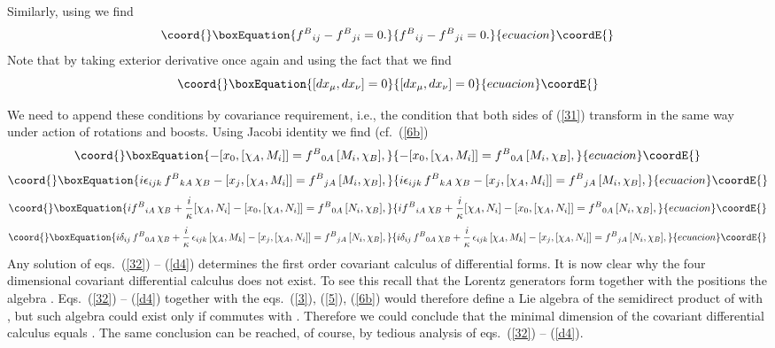 \documentclass  [12pt] {article}
\begin{document}
Similarly, using \coordHE{} we find
\begin{equation}\coord{}\boxEquation{\label{33a}
f^{B}{}_{ij} -f^{B}{}_{ji} =0.
}{f^{B}{}_{ij} -f^{B}{}_{ji} =0.
}{ecuacion}\coordE{}\end{equation}
Note that by taking exterior derivative once again and using the fact that \coordHE{} we find
\begin{equation}\coord{}\boxEquation{\label{33b}
 [dx_\mu, dx_\nu] =0
}{[dx_\mu, dx_\nu] =0
}{ecuacion}\coordE{}\end{equation}

 We need to append these conditions by
covariance requirement, i.e., the condition that both sides of (\ref{31})
transform in the same way under action of rotations and boosts. Using Jacobi
identity we find (cf.\ (\ref{6b})
\begin{equation}\coord{}\boxEquation{\label{d1}
 - [x_0, [\chi_A, M_i]] =f^{B}{}_{0 A}\, [M_i,
\chi_B],
}{- [x_0, [\chi_A, M_i]] =f^{B}{}_{0 A}\, [M_i,
\chi_B],
}{ecuacion}\coordE{}\end{equation}
\begin{equation}\coord{}\boxEquation{\label{d2}
 i\epsilon_{ijk}\, f^{B}{}_{k A}\, \chi_B- [x_j, [\chi_A,
M_i]] =f^{B}{}_{j A}\, [M_i, \chi_B],
}{i\epsilon_{ijk}\, f^{B}{}_{k A}\, \chi_B- [x_j, [\chi_A,
M_i]] =f^{B}{}_{j A}\, [M_i, \chi_B],
}{ecuacion}\coordE{}\end{equation}
\begin{equation}\coord{}\boxEquation{\label{d3}
 i f^{B}{}_{i A}\, \chi_B+\frac{i}\kappa [\chi_A,N_i]- [x_0,
[\chi_A, N_i]] =f^{B}{}_{0 A}\, [N_i, \chi_B],
}{i f^{B}{}_{i A}\, \chi_B+\frac{i}\kappa [\chi_A,N_i]- [x_0,
[\chi_A, N_i]] =f^{B}{}_{0 A}\, [N_i, \chi_B],
}{ecuacion}\coordE{}\end{equation}
\begin{equation}\coord{}\boxEquation{\label{d4}
 i\delta_{ij}\, f^{B}{}_{0 A}\, \chi_B
+\frac{i}\kappa\,\epsilon_{ijk}\, [\chi_A,M_k]- [x_j, [\chi_A, N_i]]
=f^{B}{}_{j A}\, [N_i, \chi_B],
}{i\delta_{ij}\, f^{B}{}_{0 A}\, \chi_B
+\frac{i}\kappa\,\epsilon_{ijk}\, [\chi_A,M_k]- [x_j, [\chi_A, N_i]]
=f^{B}{}_{j A}\, [N_i, \chi_B],
}{ecuacion}\coordE{}\end{equation}
 Any solution of eqs.~(\ref{32})  -- (\ref{d4}) determines
the first order covariant calculus of differential forms. It is now clear why
the four dimensional covariant differential calculus does not exist. To see
this recall that the Lorentz generators form together with the positions the
algebra \coordHE{}. Eqs.~(\ref{32}) -- (\ref{d4}) together with the
eqs.~(\ref{3}), (\ref{5}), (\ref{6b}) would therefore define a Lie algebra of
the semidirect product of \coordHE{} with \coordHE{}, but such algebra could exist
only if \coordHE{} commutes with \coordHE{}. Therefore we could conclude that the
minimal dimension of the covariant differential calculus equals \coordHE{}. The same
conclusion can be reached, of course, by tedious analysis of eqs.~(\ref{32}) --
 (\ref{d4}).
\end{document}
